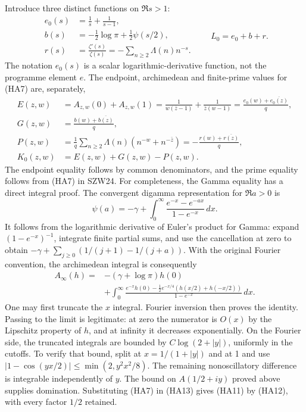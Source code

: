 \documentclass[
  10pt,
  a4paper,
]{article}
\begin{document}
Introduce three distinct functions on \(\Re s>1\): \[
\begin{aligned}
e_0(s)&=\frac1s+\frac1{s-1},\\
b(s)&=-\tfrac12\log\pi+\tfrac12\psi(s/2),\\
r(s)&=\frac{\zeta'(s)}{\zeta(s)}=-\sum_{n\ge2}\Lambda(n)n^{-s}.
\end{aligned}\qquad L_0=e_0+b+r.
\tag{HA10}
\] The notation \(e_0(s)\) is a scalar logarithmic-derivative function,
not the programme element \(e\). The endpoint, archimedean and
finite-prime values for (HA7) are, separately, \[
\begin{aligned}
E(z,w)&=A_{z,w}(0)+A_{z,w}(1)
=\frac1{w(\bar z-1)}+\frac1{\bar z(w-1)}
=\frac{e_0(w)+\overline{e_0(z)}}q,\\
G(z,w)&=\frac{b(w)+\overline{b(z)}}q,\\
P(z,w)&=\frac1q\sum_{n\ge2}\Lambda(n)(n^{-w}+n^{-\bar z})
=-\frac{r(w)+\overline{r(z)}}q,\\
K_0(z,w)&=E(z,w)+G(z,w)-P(z,w).
\end{aligned}\tag{HA11}
\] The endpoint equality follows by common denominators, and the prime
equality follows from (HA7) in SZW24. For completeness, the Gamma
equality has a direct integral proof. The convergent digamma
representation for \(\Re a>0\) is \[
\psi(a)=-\gamma+\int_0^\infty
\frac{e^{-x}-e^{-ax}}{1-e^{-x}}\,dx.
\tag{HA12}
\] It follows from the logarithmic derivative of Euler's product for
Gamma: expand \((1-e^{-x})^{-1}\), integrate finite partial sums, and
use the cancellation at zero to obtain
\(-\gamma+\sum_{j\ge0}(1/(j+1)-1/(j+a))\). With the original Fourier
convention, the archimedean integral is consequently \[
\begin{aligned}
A_\infty(h)=&-(\gamma+\log\pi)h(0)\\
&+\int_0^\infty\frac{e^{-x}h(0)-\frac12e^{-x/4}(h(x/2)+h(-x/2))}{1-e^{-x}}\,dx.
\end{aligned}\tag{HA13}
\] One may first truncate the \(x\) integral. Fourier inversion then
proves the identity. Passing to the limit is legitimate: at zero the
numerator is \(O(x)\) by the Lipschitz property of \(h\), and at
infinity it decreases exponentially. On the Fourier side, the truncated
integrals are bounded by \(C\log(2+|y|)\), uniformly in the cutoffs. To
verify that bound, split at \(x=1/(1+|y|)\) and at 1 and use
\(|1-\cos(yx/2)|\le\min(2,y^2x^2/8)\). The remaining nonoscillatory
difference is integrable independently of \(y\). The bound on
\(A(1/2+iy)\) proved above supplies domination. Substituting (HA7) in
(HA13) gives (HA11) by (HA12), with every factor \(1/2\) retained.
\end{document}
